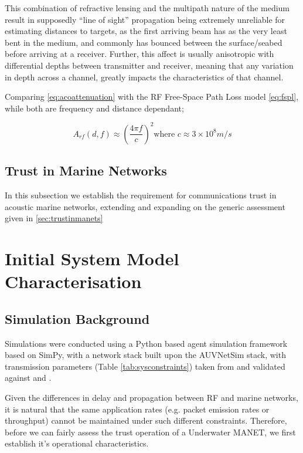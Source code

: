 \documentclass[runningheads,a4paper]{llncs}
\begin{document}
This combination of refractive lensing and the multipath nature of the medium result in supposedly ``line of sight'' propagation being extremely unreliable for estimating distances to targets, as the first arriving beam has as the very least bent in the medium, and commonly has bounced between the surface/seabed before arriving at a receiver.
Further, this affect is usually anisotropic with differential depths between transmitter and receiver, meaning that any variation in depth across a channel, greatly impacts the characteristics of that channel.

Comparing \eqref{eq:acoattenuation} with the RF Free-Space Path Loss model \eqref{eq:fspl}, while both are frequency and distance dependant; 

\begin{equation}
  \label{eq:fspl}
  A_{rf}(d,f) \approx \left( \frac{4\pi f}{c} \right)^2
  \text{where }c\approx 3\times10^8m/s
\end{equation}



\subsection{Trust in Marine Networks}

In this subsection we establish the requirement for communications trust in acoustic marine networks, extending and expanding on the generic assessment given in \ref{sec:trustinmanets}

\section{Initial System Model Characterisation}\label{sec:initialsystemcharacterisation}

\subsection{Simulation Background}

Simulations were conducted using a Python based agent simulation framework based on SimPy\cite{Mueller2003SimPy}, with a network stack built upon the AUVNetSim stack\cite{Miquel2008}, with transmission parameters (Table \ref{tab:sysconstraints}) taken from and validated against \cite{Stojanovic2007} and \cite{Stefanov2011}.

Given the differences in delay and propagation between RF and marine networks, it is natural that the same application rates (e.g. packet emission rates or throughput) cannot be maintained under such different constraints.
Therefore, before we can fairly assess the trust operation of a Underwater MANET, we first establish it's operational characteristics.
\end{document}
